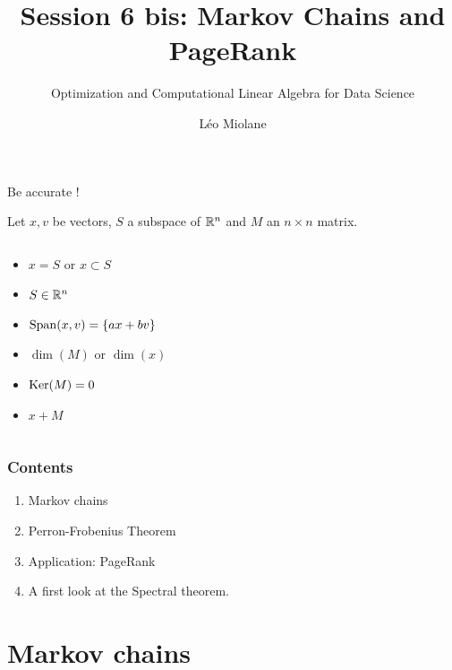 \documentclass{beamer}
\title{Session 6 bis: Markov Chains and PageRank}
\subtitle{Optimization and Computational Linear Algebra for Data Science}
\author{Léo Miolane}
\date{}
\begin{document}
\setcounter{showProgressBar}{0}
\setcounter{showSlideNumbers}{0}

\frame{\titlepage}

\begin{frame}[t]{Be accurate !}
	\grid

	Let $x,v$ be vectors, $S$ a subspace of $\mathbb{R}^n$ and $M$ an $n \times n$ matrix.

	\vspace{1.5cm}
	\begin{columns}
	\begin{column}{0.45\textwidth}
			\begin{itemize}
				\item $x = S$ or $x \subset S$
	\vspace{0.2cm}
				\item $S \in \mathbb{R}^n$
	\vspace{0.2cm}
				\item ${{\rm Span}}(x,v) = \{a x + b v \}$
	\vspace{0.2cm}
				\item $\dim(M)$ or $\dim(x)$
	\vspace{0.2cm}
				\item ${{\rm Ker}}(M) = 0$
	\vspace{0.2cm}
				\item $x+M$

			\end{itemize}
	\end{column}
	\vrule
	\begin{column}{0.50\textwidth}
	\end{column}
	\end{columns}

\end{frame}


\begin{frame}
	\frametitle{Contents}
	\begin{enumerate}
		\item Markov chains
		\item Perron-Frobenius Theorem
		\item Application: PageRank
		\item A first look at the Spectral theorem.
	\end{enumerate}
\end{frame}


\setcounter{framenumber}{0}
\setcounter{showSlideNumbers}{1}


\section{Markov chains}
\end{document}
